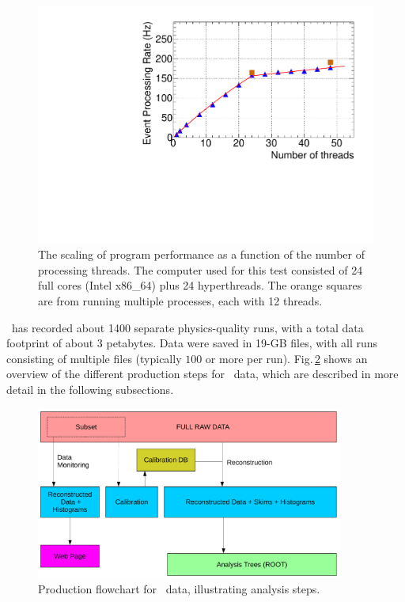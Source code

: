 \begin{figure}[h!]\centering
\includegraphics[width=1.0\textwidth]{figures/rate_vs_nthread.pdf}
\caption[]{\label{fig:offline_monitorA}The scaling of program performance as a function of the number of processing threads. The computer used for this test consisted of 24 full cores (Intel x86\_64) plus 24 hyperthreads. The orange squares are from running multiple processes, each with 12 threads.} 
\end{figure}

\GX~has recorded about 1400 separate physics-quality runs, with a total data footprint of about 3 petabytes. Data were saved in 19-GB files, with all runs consisting of multiple files (typically $100$ or more per run). Fig.\,\ref{fig:production_overview} shows an overview of the different production steps for \GX~data, which are described in more detail in the following subsections.

\begin{figure}[hbt]\centering
\includegraphics[width=0.9\textwidth]{figures/production_overview_calib_v2.pdf}
\caption[]{\label{fig:production_overview}Production flowchart for \GX~data, illustrating analysis steps.} 
\end{figure}

